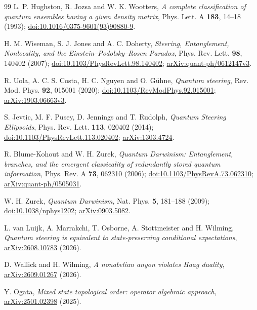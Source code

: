 \documentclass[11pt,a4paper]{article}
\theoremstyle{definition}
\theoremstyle{plain}
\begin{document}
\clearpage
\begingroup\small
\begin{thebibliography}{99}
\setlength{\itemsep}{2pt}
L. P. Hughston, R. Jozsa and W. K. Wootters,
\emph{A complete classification of quantum ensembles having a given density matrix},
Phys. Lett. A \textbf{183}, 14--18 (1993);
\href{https://doi.org/10.1016/0375-9601(93)90880-9}{doi:10.1016/0375-9601(93)90880-9}.

H. M. Wiseman, S. J. Jones and A. C. Doherty,
\emph{Steering, Entanglement, Nonlocality, and the Einstein--Podolsky--Rosen Paradox},
Phys. Rev. Lett. \textbf{98}, 140402 (2007);
\href{https://doi.org/10.1103/PhysRevLett.98.140402}{doi:10.1103/PhysRevLett.98.140402};
\href{https://arxiv.org/abs/quant-ph/0612147v3}{arXiv:quant-ph/0612147v3}.

R. Uola, A. C. S. Costa, H. C. Nguyen and O. G\"uhne,
\emph{Quantum steering}, Rev. Mod. Phys. \textbf{92}, 015001 (2020);
\href{https://doi.org/10.1103/RevModPhys.92.015001}{doi:10.1103/RevModPhys.92.015001};
\href{https://arxiv.org/abs/1903.06663v3}{arXiv:1903.06663v3}.

S. Jevtic, M. F. Pusey, D. Jennings and T. Rudolph,
\emph{Quantum Steering Ellipsoids}, Phys. Rev. Lett. \textbf{113}, 020402 (2014);
\href{https://doi.org/10.1103/PhysRevLett.113.020402}{doi:10.1103/PhysRevLett.113.020402};
\href{https://arxiv.org/abs/1303.4724}{arXiv:1303.4724}.

R. Blume-Kohout and W. H. Zurek,
\emph{Quantum Darwinism: Entanglement, branches, and the emergent classicality
of redundantly stored quantum information},
Phys. Rev. A \textbf{73}, 062310 (2006);
\href{https://doi.org/10.1103/PhysRevA.73.062310}{doi:10.1103/PhysRevA.73.062310};
\href{https://arxiv.org/abs/quant-ph/0505031}{arXiv:quant-ph/0505031}.

W. H. Zurek, \emph{Quantum Darwinism}, Nat. Phys. \textbf{5}, 181--188 (2009);
\href{https://doi.org/10.1038/nphys1202}{doi:10.1038/nphys1202};
\href{https://arxiv.org/abs/0903.5082}{arXiv:0903.5082}.

L. van Luijk, A. Marrakchi, T. Osborne, A. Stottmeister and H. Wilming,
\emph{Quantum steering is equivalent to state-preserving conditional expectations},
\href{https://arxiv.org/abs/2608.10783}{arXiv:2608.10783} (2026).

D. Wallick and H. Wilming,
\emph{A nonabelian anyon violates Haag duality},
\href{https://arxiv.org/abs/2609.01267}{arXiv:2609.01267} (2026).

Y. Ogata, \emph{Mixed state topological order: operator algebraic approach},
\href{https://arxiv.org/abs/2501.02398}{arXiv:2501.02398} (2025).
\end{thebibliography}
\endgroup
\end{document}
